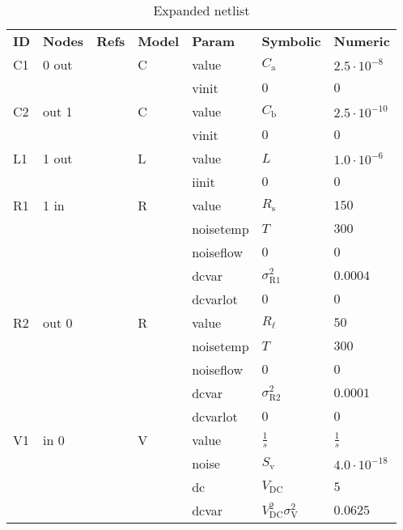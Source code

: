 \begin{table}[H]
\centering
\begin{tabular}[c]{lllllll}
\textbf{ID} & \textbf{Nodes} & \textbf{Refs} & \textbf{Model} & \textbf{Param} & \textbf{Symbolic} & \textbf{Numeric} \\ 
\rowcolor{myyellow}
\small{C1} &\small{0 out } & &\small{C} &\small{value} &$C_{\mathrm{a}}$ &$2.5 \cdot 10^{-8}$ \\ 
 & & & &\small{vinit} &$0$ &$0$ \\ 
\rowcolor{myyellow}
\small{C2} &\small{out 1 } & &\small{C} &\small{value} &$C_{\mathrm{b}}$ &$2.5 \cdot 10^{-10}$ \\ 
 & & & &\small{vinit} &$0$ &$0$ \\ 
\rowcolor{myyellow}
\small{L1} &\small{1 out } & &\small{L} &\small{value} &$L$ &$1.0 \cdot 10^{-6}$ \\ 
 & & & &\small{iinit} &$0$ &$0$ \\ 
\rowcolor{myyellow}
\small{R1} &\small{1 in } & &\small{R} &\small{value} &$R_{\mathrm{s}}$ &$150$ \\ 
 & & & &\small{noisetemp} &$T$ &$300$ \\ 
\rowcolor{myyellow}
 & & & &\small{noiseflow} &$0$ &$0$ \\ 
 & & & &\small{dcvar} &$\sigma_{\mathrm{R1}}^{2}$ &$0.0004$ \\ 
\rowcolor{myyellow}
 & & & &\small{dcvarlot} &$0$ &$0$ \\ 
\small{R2} &\small{out 0 } & &\small{R} &\small{value} &$R_{\ell}$ &$50$ \\ 
\rowcolor{myyellow}
 & & & &\small{noisetemp} &$T$ &$300$ \\ 
 & & & &\small{noiseflow} &$0$ &$0$ \\ 
\rowcolor{myyellow}
 & & & &\small{dcvar} &$\sigma_{\mathrm{R2}}^{2}$ &$0.0001$ \\ 
 & & & &\small{dcvarlot} &$0$ &$0$ \\ 
\rowcolor{myyellow}
\small{V1} &\small{in 0 } & &\small{V} &\small{value} &$\frac{1}{s}$ &$\frac{1}{s}$ \\ 
 & & & &\small{noise} &$S_{\mathrm{v}}$ &$4.0 \cdot 10^{-18}$ \\ 
\rowcolor{myyellow}
 & & & &\small{dc} &$V_{\mathrm{DC}}$ &$5$ \\ 
 & & & &\small{dcvar} &$V_{\mathrm{DC}}^{2} \sigma_{\mathrm{V}}^{2}$ &$0.0625$ \\ 
\end{tabular}
\caption{Expanded netlist}
\label{tab-expanded}
\end{table}

